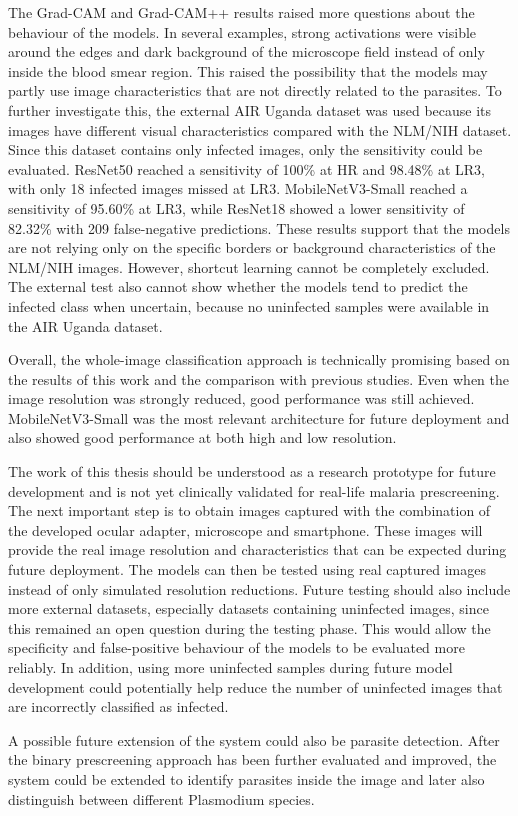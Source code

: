 The Grad-CAM and Grad-CAM++ results raised more questions about the behaviour of the models. In several examples, strong activations were visible around the edges and dark background of the microscope field instead of only inside the blood smear region. This raised the possibility that the models may partly use image characteristics that are not directly related to the parasites. To further investigate this, the external AIR Uganda dataset was used because its images have different visual characteristics compared with the NLM/NIH dataset. Since this dataset contains only infected images, only the sensitivity could be evaluated. ResNet50 reached a sensitivity of 100\% at HR and 98.48\% at LR3, with only 18 infected images missed at LR3. MobileNetV3-Small reached a sensitivity of 95.60\% at LR3, while ResNet18 showed a lower sensitivity of 82.32\% with 209 false-negative predictions. These results support that the models are not relying only on the specific borders or background characteristics of the NLM/NIH images. However, shortcut learning cannot be completely excluded. The external test also cannot show whether the models tend to predict the infected class when uncertain, because no uninfected samples were available in the AIR Uganda dataset.

Overall, the whole-image classification approach is technically promising based on the results of this work and the comparison with previous studies. Even when the image resolution was strongly reduced, good performance was still achieved. MobileNetV3-Small was the most relevant architecture for future deployment and also showed good performance at both high and low resolution. 

The work of this thesis should be understood as a research prototype for future development and is not yet clinically validated for real-life malaria prescreening. The next important step is to obtain images captured with the combination of the developed ocular adapter, microscope and smartphone. These images will provide the real image resolution and characteristics that can be expected during future deployment. The models can then be tested using real captured images instead of only simulated resolution reductions. Future testing should also include more external datasets, especially datasets containing uninfected images, since this remained an open question during the testing phase. This would allow the specificity and false-positive behaviour of the models to be evaluated more reliably. In addition, using more uninfected samples during future model development could potentially help reduce the number of uninfected images that are incorrectly classified as infected.

A possible future extension of the system could also be parasite detection. After the binary prescreening approach has been further evaluated and improved, the system could be extended to identify parasites inside the image and later also distinguish between different Plasmodium species.
